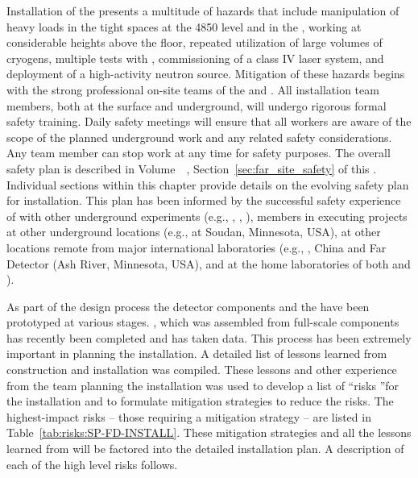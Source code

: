 %


Installation of the  presents a multitude of hazards that include  manipulation of heavy loads in the tight spaces at the 4850 level and in the ,  working at considerable heights above the floor, repeated utilization of large volumes of cryogens, multiple tests with , commissioning of a class IV laser system, and deployment of a high-activity neutron source. Mitigation of these hazards begins with the strong professional on-site  teams of the  and .
All installation team members, both at the surface and underground, will undergo rigorous formal safety training. Daily safety meetings will ensure that all workers are aware of the scope of the planned underground work and any related safety considerations. Any team member can stop work at any time for safety purposes. The overall  safety plan is described in   
 Volume~\volnumbertc~\voltitletc, Section~\ref{sec:far_site_safety} of this .  Individual sections within this chapter provide details on the evolving safety plan for installation. This plan has been informed by the successful safety experience of  with other underground experiments (e.g., , , ),  members in executing projects at other underground locations (e.g.,  at Soudan, Minnesota, USA), at other locations remote from major international laboratories (e.g., , China and  Far Detector (Ash River, Minnesota, USA), and at the home laboratories of both  and ).



As part of the  design process the detector components and the  have been prototyped at various stages. , which was assembled from full-scale %
components has recently been completed and has taken data. 
This process has been extremely important in planning the  %
installation. A detailed list of lessons learned from  construction and installation was compiled\cite{bib:docdb8255}. 
These lessons %
and other experience from the team planning the installation was used to develop a list of \textquotedblleft risks \textquotedblright for the %
 installation and to formulate mitigation strategies to reduce the risks.
The highest-impact risks -- those requiring a mitigation strategy -- are listed in Table~\ref{tab:risks:SP-FD-INSTALL}. 
These mitigation strategies and all the lessons learned from  will be factored into the detailed installation plan. A description of each of the high level risks follows.

